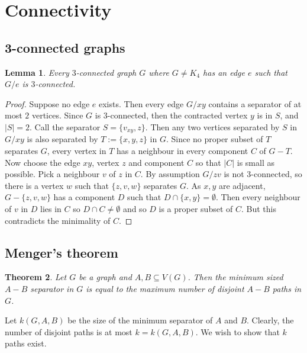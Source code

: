 \documentclass{article}
\author{Eric Luu}
\newtheorem{theorem}{Theorem}
\newtheorem{lemma}[theorem]{Lemma}
\begin{document}
\section{Connectivity}

\subsection{3-connected graphs}

\begin{lemma}
    Every $3$-connected graph $G$ where $G \neq K_4$ has an edge $e$ such that $G/e$ is $3$-connected.
\end{lemma}
\begin{proof}
    Suppose no edge $e$ exists. Then every edge $G/xy$ contains a separator of at most $2$ vertices. Since $G$ is $3$-connected, then the contracted vertex $y$ is in $S$, and $|S| = 2$. Call the separator $S = \{v_{xy}, z\}$. Then any two vertices separated by $S$ in $G/xy$ is also separated by $T := \{x,y, z\}$ in $G$. Since no proper subset of $T$ separates $G$, every vertex in $T$ has a neighbour in every component $C$ of $G - T$. Now choose the edge $xy$, vertex $z$ and component $C$ so that $|C|$ is small as possible. Pick a neighbour $v$ of $z$ in $C$. By assumption $G/{zv}$ is not 3-connected, so there is a vertex $w$ such that $\{z,v,w\}$ separates $G$. As $x, y$ are adjacent, $G - \{z,v,w\}$ has a component $D$ such that $D \cap \{x,y\}= \emptyset$. Then every neighbour of $v$ in $D$ lies in $C$ so $D \cap C \neq \emptyset$ and so $D$ is a proper subset of $C$. But this contradicts the minimality of $C$. 
\end{proof}

\subsection{Menger's theorem}

\begin{theorem}
    Let $G$ be a graph and $A, B \subseteq V(G)$. Then the minimum sized $A-B$ separator in $G$ is equal to the maximum number of disjoint $A-B$ paths in $G$. 
\end{theorem}
Let $k(G, A, B)$ be the size of the minimum separator of $A$ and $B$. Clearly, the number of disjoint paths is at most $k = k(G, A, B)$. We wish to show that $k$ paths exist.
\end{document}
